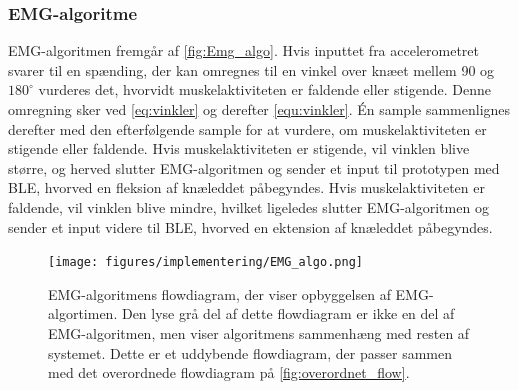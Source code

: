 \subsubsection{EMG-algoritme}
EMG-algoritmen fremgår af \autoref{fig:Emg_algo}. Hvis inputtet fra accelerometret svarer til en spænding, der kan omregnes til en vinkel over knæet mellem 90 og $180^{\circ}$ vurderes det, hvorvidt muskelaktiviteten er faldende eller stigende. Denne omregning sker ved \autoref{eq:vinkler} og derefter \autoref{equ:vinkler}. Én sample sammenlignes derefter med den efterfølgende sample for at vurdere, om muskelaktiviteten er stigende eller faldende. Hvis muskelaktiviteten er stigende, vil vinklen blive større, og herved slutter EMG-algoritmen og sender et input til prototypen med BLE, hvorved en fleksion af knæleddet påbegyndes. Hvis muskelaktiviteten er faldende, vil vinklen blive mindre, hvilket ligeledes slutter EMG-algoritmen og sender et input videre til BLE, hvorved en ektension af knæleddet påbegyndes. 
\begin{figure}[H]
\centering
\texttt{[image: figures/implementering/EMG\_algo.png]}
\caption{EMG-algoritmens flowdiagram, der viser opbyggelsen af EMG-algortimen. Den lyse grå del af dette flowdiagram er ikke en del af EMG-algoritmen, men viser algoritmens sammenhæng med resten af systemet. Dette er et uddybende flowdiagram, der passer sammen med det overordnede flowdiagram på \autoref{fig:overordnet_flow}.}
\label{fig:Emg_algo}
\end{figure}

